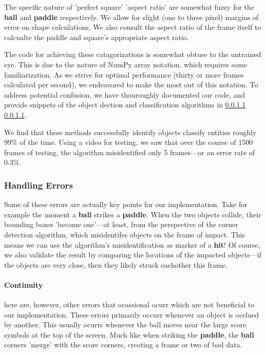 \documentclass{report}
\newcommand{\state}[1]{\textbf{#1}}
\newcommand{\pad}{\textbf{paddle}\xspace}
\newcommand{\ball}{\textbf{ball}\xspace}
\begin{document}
The specific nature of 'perfect square' 'aspect ratio' are somewhat fuzzy for the \ball and \pad respectively. We allow for slight (one to three pixel) margins of error on shape calculations, We also consult the aspect ratio of the frame itself to calcualte the paddle and square's appropriate aspect ratio. 


The code for achieving these catagorizations is somewhat obtuse to the untrained eye. This is due to the nature of NumPy array notation, which requires some familiarization. As we strive for optimal performance (thirty or more frames calculated per second), we endeavored to make the most out of this notation. To address potential confusion, we have thouroughly documented our code, and provide snippets of the object dection and classification algorithms in \ref{} \ref{}.

We find that these methods successfully identify objects classify entities roughly 99\% of the time. Using a video for testing, we saw that over the course of 1500 frames of testing, the algorithm misidentified only 5 frames---or an error rate of $0.3\%$. 

\subsubsection{Handling Errors}

Some of these errors are actually key points for our implementation. Take for example the moment a \ball strikes a \pad. When the two objects collide, their bounding boxes 'become one'---at least, from the perspective of the corner detection algorithm, which misidentifes objects on the frame of impact. This means we can use the algorithm's misidentification as marker of a \state{hit}! Of course, we also validate the result by comparing the locations of the impacted objects---if the objects are very close, then they likely struck eachother this frame.

\paragraph{Continuity}

here are, however, other errors that ocassional ocurr which are not beneficial to our implementation. These errors primarily occurr whenever an object is occlued by another. This usually ocurrs whenever the ball moves near the large score symbols at the top of the screen. Much like when striking the \pad, the \ball corners 'merge' with the score corners, creating a frame or two of bad data. 
\end{document}
